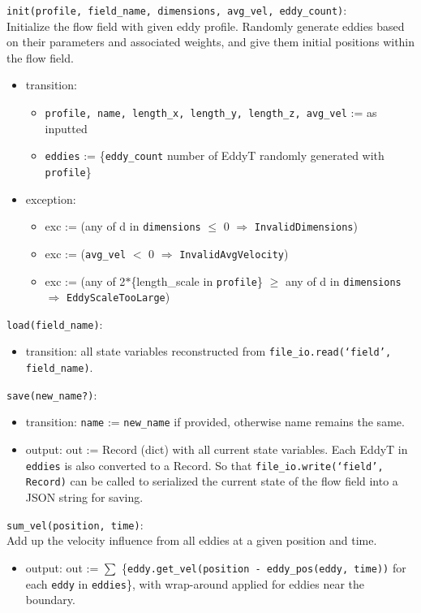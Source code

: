\documentclass[12pt, titlepage]{article}
\begin{document}
\noindent \texttt{init(profile, field\_name, dimensions, avg\_vel, eddy\_count)}:\\
Initialize the flow field with given eddy profile. Randomly generate eddies based on their parameters and associated weights, and give them initial positions within the flow field.
\begin{itemize}
\item transition: 
  \begin{itemize}
    \item \texttt{profile, name, length\_x, length\_y, length\_z, avg\_vel} := as inputted
    \item \texttt{eddies} := \{\texttt{eddy\_count} number of EddyT randomly generated with \texttt{profile}\}
  \end{itemize}
\item exception: 
  \begin{itemize}
    \item exc := (any of d in \texttt{dimensions} $\le$ 0 $\Rightarrow$ \texttt{InvalidDimensions})
    \item exc := (\texttt{avg\_vel} $<$ 0 $\Rightarrow$ \texttt{InvalidAvgVelocity})
    \item exc := (any of 2$*$\{length\_scale in \texttt{profile}\} $\ge$ any of d in \texttt{dimensions} $\Rightarrow$ \texttt{EddyScaleTooLarge})
  \end{itemize}
\end{itemize}

\noindent \texttt{load(field\_name)}:
\begin{itemize}
  \item transition: all state variables reconstructed from \texttt{file\_io.read(`field', field\_name)}.
\end{itemize}

\noindent \texttt{save(new\_name?)}:
\begin{itemize}
  \item transition: \texttt{name} := \texttt{new\_name} if provided, otherwise name remains the same.
  \item output: out := Record (dict) with all current state variables. Each EddyT in \texttt{eddies} is also converted to a Record. So that \texttt{file\_io.write(`field', Record)} can be called to serialized the current state of the flow field into a JSON string for saving.
\end{itemize}

\noindent \texttt{sum\_vel(position, time)}:\\
Add up the velocity influence from all eddies at a given position and time.
\begin{itemize}
  \item output: out := $\sum$ \{\texttt{eddy.get\_vel(position - eddy\_pos(eddy, time))} for each \texttt{eddy} in \texttt{eddies}\}, with wrap-around applied for eddies near the boundary.
\end{itemize}
\end{document}
